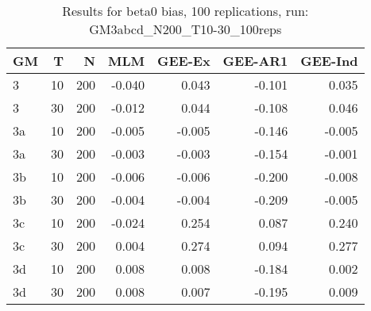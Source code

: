 \begin{table}[ht]
\centering
\begin{tabular}{lrrrrrr}
  \hline
GM & T & N & MLM & GEE-Ex & GEE-AR1 & GEE-Ind \\ 
  \hline
3 & 10 & 200 & -0.040 & 0.043 & -0.101 & 0.035 \\ 
  3 & 30 & 200 & -0.012 & 0.044 & -0.108 & 0.046 \\ 
  3a & 10 & 200 & -0.005 & -0.005 & -0.146 & -0.005 \\ 
  3a & 30 & 200 & -0.003 & -0.003 & -0.154 & -0.001 \\ 
  3b & 10 & 200 & -0.006 & -0.006 & -0.200 & -0.008 \\ 
  3b & 30 & 200 & -0.004 & -0.004 & -0.209 & -0.005 \\ 
  3c & 10 & 200 & -0.024 & 0.254 & 0.087 & 0.240 \\ 
  3c & 30 & 200 & 0.004 & 0.274 & 0.094 & 0.277 \\ 
  3d & 10 & 200 & 0.008 & 0.008 & -0.184 & 0.002 \\ 
  3d & 30 & 200 & 0.008 & 0.007 & -0.195 & 0.009 \\ 
   \hline
\end{tabular}
\caption{Results for beta0 bias, 100 replications, run: GM3abcd_N200_T10-30_100reps} 
\label{tab:beta0_bias}
\end{table}
